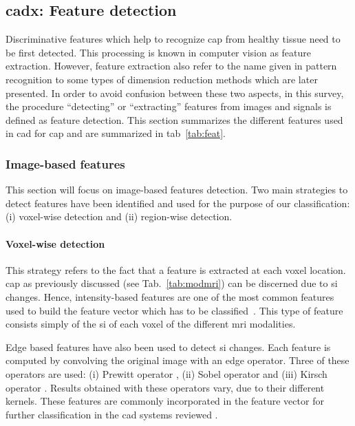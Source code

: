 \subsection{\acs*{cadx}: Feature detection} \label{subsec:chp3:img-clas:CADX-fea-dec}

Discriminative features which help to recognize \ac{cap} from healthy tissue need to be first detected.
This processing is known in computer vision as feature extraction. 
However, feature extraction also refer to the name given in pattern recognition to some types of dimension reduction methods which are later presented.
In order to avoid confusion between these two aspects, in this survey, the procedure ``detecting'' or ``extracting'' features from images and signals is defined as feature detection.
This section summarizes the different features used in \ac{cad} for \ac{cap} and are summarized in \acs{tab}~\ref{tab:feat}.  



\subsubsection{Image-based features}\label{subsubsec:chp3:img-clas:CADX-fea-dec:Img-fea}

This section will focus on image-based features detection.
Two main strategies to detect features have been identified and used for the purpose of our classification: (i) voxel-wise detection and (ii) region-wise detection.

\paragraph{Voxel-wise detection}
This strategy refers to the fact that a feature is extracted at each voxel location.
\ac{cap} as previously discussed (see Tab.~\ref{tab:modmri}) can be discerned due to \ac{si} changes.
Hence, intensity-based features are one of the most common features used to build the feature vector which has to be classified~\cite{Ampeliotis2007,Ampeliotis2008,Artan2009,Artan2010,Chan2003,Langer2009,Liu2009,Niaf2011,Niaf2012,Viswanath2008a,Viswanath2011}.
This type of feature consists simply of the \ac{si} of each voxel of the different \ac{mri} modalities.

Edge based features have also been used to detect \ac{si} changes.
Each feature is computed by convolving the original image with an edge operator.
Three of these operators are used: (i) Prewitt operator \cite{Prewitt1970}, (ii) Sobel operator \cite{Sobel1970} and (iii) Kirsch operator \cite{Kirsch1971}.
Results obtained with these operators vary, due to their different kernels.
These features are commonly incorporated in the feature vector for further classification in the \ac{cad} systems reviewed \cite{Niaf2011,Niaf2012,Tiwari2009a,Tiwari2010,Tiwari2013,Viswanath2008,Viswanath2011}.

